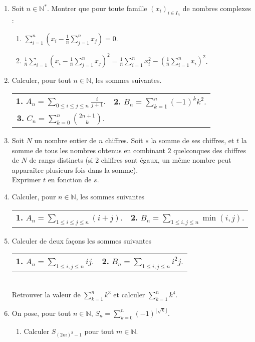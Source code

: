 \documentclass[7pt, twocolumn]{extarticle}
\newcommand{\q}[1]{\textbf{#1.}\quad}
\def\N{\mathbb N}
\begin{document}
	\vspace{2mm}
	\begin{enumerate}[start=4,label={\bfseries \arabic*}]
		\item Soit $n\in\N^*$. Montrer que pour toute famille $(x_i)_{i\in I_n}$ de nombres complexes :
		\begin{enumerate}[start=1, label={\bfseries \arabic*.}]
			\item \(\sum_{i=1}^n\left(x_i-\frac1n\sum_{j=1}^nx_j\right)=0\).
			\item \(\frac1n\sum_{i=1}\left(x_i-\frac1n\sum_{j=1}^nx_j\right)^2=\frac1n\sum_{i=1}^nx_i^2-\left(\frac1n\sum_{i=1}^nx_i\right)^2\).
		\end{enumerate}
		\item Calculer, pour tout $n\in\N$, les sommes suivantes.
		\begin{tabular}{c c}
			\q{1} \(A_n=\sum_{0\leq i\leq j\leq n}\frac i{j+1}\). & \q{2} \(B_n=\sum_{k=1}^n(-1)^kk^2\).\\
			\q{3} \(C_n=\sum_{k=0}^n\binom{2n+1}k\).
		\end{tabular}
		\item Soit $N$ un nombre entier de $n$ chiffres. Soit $s$ la somme de ses chiffres, et $t$ la somme de tous les nombres obtenus en combinant $2$ quelconques des chiffres de $N$ de rangs distincts (si $2$ chiffres sont égaux, un même nombre peut apparaître plusieurs fois dans la somme).\\
		Exprimer $t$ en fonction de $s$.
		\item Calculer, pour $n\in\N$, les sommes suivantes 
		\begin{tabular}{c c}
			\q{1} \(A_n=\sum_{1\leq i\leq j\leq n}(i+j)\). & \q{2} \(B_n=\sum_{1\leq i,j\leq n}\min(i,j)\).
		\end{tabular}
		\item Calculer de deux façons les sommes suivantes\\
		\begin{tabular}{c c}
			\q{1} \(A_n=\sum_{1\leq i,j\leq n}ij\). & \q{2} \(B_n=\sum_{1\leq i,j\leq n}i^2j\).
		\end{tabular}\\
		Retrouver la valeur de $\sum_{k=1}^nk^3$ et calculer $\sum_{k=1}^nk^4$.
		\item On pose, pour tout $n\in\N$, $S_n=\sum_{k=0}^n(-1)^{\lfloor \sqrt{k}\rfloor}$.
		\begin{enumerate}[start=1, label={\bfseries \arabic*.}]
			\item Calculer $S_{(2m)^2-1}$ pour tout $m\in\N$.

\end{enumerate}
\end{enumerate}
\end{document}
